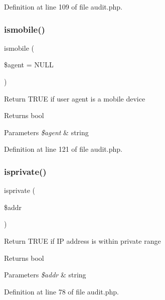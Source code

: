 Definition at line 109 of file audit.\+php.

\hypertarget{class_audit_afbca2bf25d7295857c0e7b161ab21beb}{}\label{class_audit_afbca2bf25d7295857c0e7b161ab21beb} 
\subsubsection{\texorpdfstring{ismobile()}{ismobile()}}
{\footnotesize\ttfamily ismobile (\begin{DoxyParamCaption}\item[{}]{\$agent = {\ttfamily NULL} }\end{DoxyParamCaption})}

Return T\+R\+UE if user agent is a mobile device \begin{DoxyReturn}{Returns}
bool 
\end{DoxyReturn}

\begin{DoxyParams}{Parameters}
{\em \$agent} & string \\
\hline
\end{DoxyParams}


Definition at line 121 of file audit.\+php.

\hypertarget{class_audit_a9bb5536f5e8cfe33672340a407daa387}{}\label{class_audit_a9bb5536f5e8cfe33672340a407daa387} 
\subsubsection{\texorpdfstring{isprivate()}{isprivate()}}
{\footnotesize\ttfamily isprivate (\begin{DoxyParamCaption}\item[{}]{\$addr }\end{DoxyParamCaption})}

Return T\+R\+UE if IP address is within private range \begin{DoxyReturn}{Returns}
bool 
\end{DoxyReturn}

\begin{DoxyParams}{Parameters}
{\em \$addr} & string \\
\hline
\end{DoxyParams}


Definition at line 78 of file audit.\+php.

\hypertarget{class_audit_a421f0166ffee8171ee3948970abcecad}{}\label{class_audit_a421f0166ffee8171ee3948970abcecad} 
